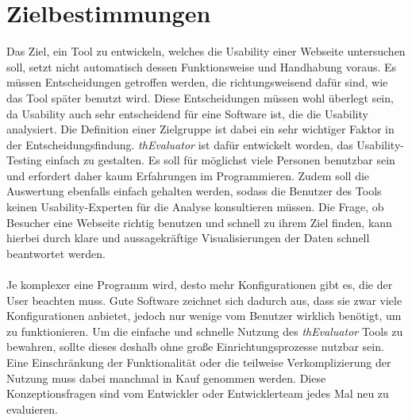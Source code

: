 %
%
%
%


\section{Zielbestimmungen}

Das Ziel, ein Tool zu entwickeln, welches die Usability einer Webseite untersuchen soll, setzt nicht automatisch dessen Funktionsweise und Handhabung voraus. Es müssen Entscheidungen getroffen werden, die richtungsweisend dafür sind, wie das Tool später benutzt wird. Diese Entscheidungen müssen wohl überlegt sein, da Usability auch sehr entscheidend für eine Software ist, die die Usability analysiert. Die Definition einer Zielgruppe ist dabei ein sehr wichtiger Faktor in der Entscheidungsfindung. \textit{thEvaluator} ist dafür entwickelt worden, das Usability-Testing einfach zu gestalten. Es soll für möglichst viele Personen benutzbar sein und erfordert daher kaum Erfahrungen im Programmieren. Zudem soll die Auswertung ebenfalls einfach gehalten werden, sodass die Benutzer des Tools keinen Usability-Experten für die Analyse konsultieren müssen. Die Frage, ob Besucher eine Webseite richtig benutzen und schnell zu ihrem Ziel finden, kann hierbei durch klare und aussagekräftige Visualisierungen der Daten schnell beantwortet werden.\\
\\
Je komplexer eine Programm wird, desto mehr Konfigurationen gibt es, die der User beachten muss. Gute Software zeichnet sich dadurch aus, dass sie zwar viele Konfigurationen anbietet, jedoch nur wenige vom Benutzer wirklich benötigt, um zu funktionieren. Um die einfache und schnelle Nutzung des \textit{thEvaluator} Tools zu bewahren, sollte dieses deshalb ohne große Einrichtungsprozesse nutzbar sein. Eine Einschränkung der Funktionalität oder die teilweise Verkomplizierung der Nutzung muss dabei manchmal in Kauf genommen werden. Diese Konzeptionsfragen sind vom Entwickler oder Entwicklerteam jedes Mal neu zu evaluieren.\\
\\
